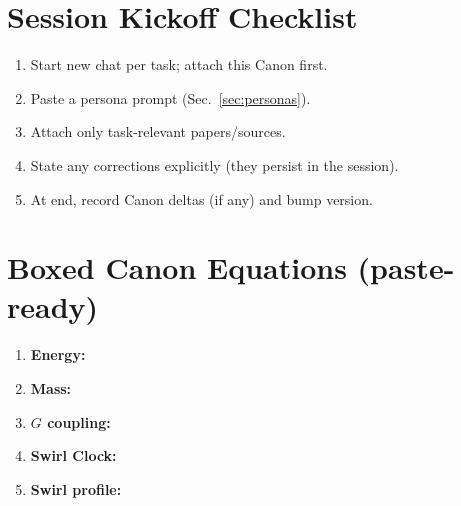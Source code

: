 \documentclass[11pt]{article}
\begin{document}
    \section{Session Kickoff Checklist}
    \begin{enumerate}
        \item Start new chat per task; attach this Canon first.
        \item Paste a persona prompt (Sec.~\ref{sec:personas}).
        \item Attach only task-relevant papers/sources.
        \item State any corrections explicitly (they persist in the session).
        \item At end, record Canon deltas (if any) and bump version.
    \end{enumerate}



    \section{Boxed Canon Equations (paste-ready)}
    \begin{enumerate}
        \item \textbf{Energy:} 
        \item \textbf{Mass:} 
        \item \textbf{$G$ coupling:} 
        \item \textbf{Swirl Clock:} 
        \item \textbf{Swirl profile:} 
    \end{enumerate}

\end{document}
